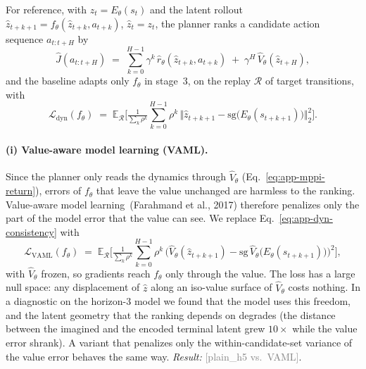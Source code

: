 \documentclass{article} %
\newcommand{\ph}[1]{\textcolor{gray}{#1}}   %
\begin{document}
For reference, with $z_t = E_\theta(s_t)$ and the latent rollout
$\hat z_{t+k+1} = f_\theta(\hat z_{t+k}, a_{t+k})$, $\hat z_t = z_t$, the planner
ranks a candidate action sequence $a_{t:t+H}$ by
\begin{equation}
\hat J(a_{t:t+H}) \;=\; \sum_{k=0}^{H-1} \gamma^{k}\, \hat r_\theta(\hat z_{t+k}, a_{t+k})
\;+\; \gamma^{H}\, \hat V_\theta(\hat z_{t+H}),
\label{eq:app-mppi-return}
\end{equation}
and the baseline adapts only $f_\theta$ in stage~3, on the replay $\mathcal{R}$ of
target transitions, with
\begin{equation}
\mathcal{L}_{\text{dyn}}(f_\theta) \;=\; \mathbb{E}_{\mathcal{R}}
\Big[\tfrac{1}{\sum_k \rho^k}\sum_{k=0}^{H-1} \rho^{k}\,
\big\Vert \hat z_{t+k+1} - \mathrm{sg}\big(E_\theta(s_{t+k+1})\big) \big\Vert_2^2\Big].
\label{eq:app-dyn-consistency}
\end{equation}

\paragraph{(i) Value-aware model learning (VAML).}
Since the planner only reads the dynamics through $\hat V_\theta$
(Eq.~\ref{eq:app-mppi-return}), errors of $f_\theta$ that leave the value
unchanged are harmless to the ranking. Value-aware model
learning~(Farahmand et al., 2017) %
therefore penalizes only the part of the model error that the value can see. We
replace Eq.~\ref{eq:app-dyn-consistency} with
\begin{equation}
\mathcal{L}_{\text{VAML}}(f_\theta) \;=\; \mathbb{E}_{\mathcal{R}}
\Big[\tfrac{1}{\sum_k \rho^k}\sum_{k=0}^{H-1} \rho^{k}\,
\big(\hat V_\theta(\hat z_{t+k+1}) - \mathrm{sg}\,\hat V_\theta\big(E_\theta(s_{t+k+1})\big)\big)^2\Big],
\end{equation}
with $\hat V_\theta$ frozen, so gradients reach $f_\theta$ only through the value.
The loss has a large null space: any displacement of $\hat z$ along an iso-value
surface of $\hat V_\theta$ costs nothing. In a diagnostic on the horizon-3 model we
found that the model uses this freedom, and the latent geometry that the ranking
depends on degrades (the distance between the imagined and the encoded terminal
latent grew $10\times$ while the value error shrank). A variant that penalizes only
the within-candidate-set variance of the value error behaves the same way.
\emph{Result:} \ph{[plain\_h5 vs.\ VAML]}.
\end{document}
